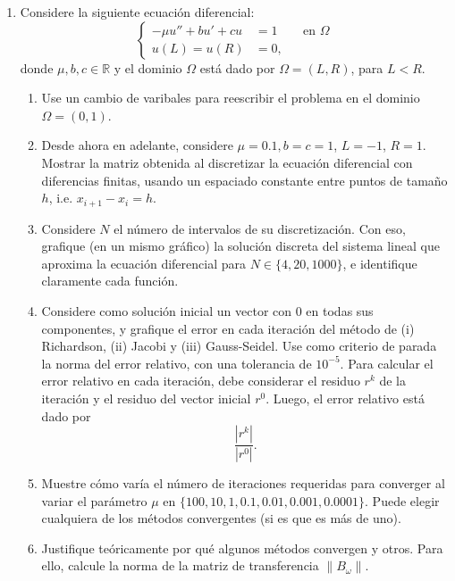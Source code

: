 \documentclass{article}
\newcommand{\pts}[1]{[{\bf #1 puntos}] }
\begin{document}
\begin{enumerate}
    \item Considere la siguiente ecuación diferencial: 
        $$
            \left\lbrace\begin{aligned}
                - \mu u'' + b u' + c u &= 1 && \text{en $\Omega$}\\
                u(L) = u(R) &= 0,
            \end{aligned}\right.
        $$
        donde $\mu, b,c\in \mathbb R$ y el dominio $\Omega$ está dado por $\Omega = (L, R)$, para $ L < R$. 
        \begin{enumerate}
            \item\pts{1} Use un cambio de varibales para reescribir el problema en el dominio $\Omega = (0,1)$.
            \item\pts{1} Desde ahora en adelante, considere $\mu=0.1, b=c=1$, $L=-1$, $R=1$. Mostrar la matriz obtenida al discretizar la ecuación diferencial con diferencias finitas, usando un espaciado constante entre puntos de tamaño $h$, i.e. $x_{i+1} - x_i = h$.
            \item\pts{1} Considere $N$ el número de intervalos de su discretización. Con eso, grafique (en un mismo gráfico) la solución discreta del sistema lineal que aproxima la ecuación diferencial para $N\in\{4, 20, 1000\}$, e identifique claramente cada función. 
            \item\pts{1}  Considere como solución inicial un vector con 0 en todas sus componentes, y grafique el error en cada iteración del método de (i) Richardson, (ii) Jacobi y (iii) Gauss-Seidel. Use como criterio de parada la norma del error relativo, con una tolerancia de $10^{-5}$. Para calcular el error relativo en cada iteración, debe considerar el residuo $r^k$ de la iteración y el residuo del vector inicial $r^0$. Luego, el error relativo está dado por 
                    $$ \frac{|r^k|}{|r^0|}. $$
            \item\pts{1} Muestre cómo varía el número de iteraciones requeridas para converger al variar el parámetro $\mu$ en $\{100,10,1,0.1,0.01,0.001,0.0001\}$. Puede elegir cualquiera de los métodos convergentes (si es que es más de uno).
            \item\pts{1} Justifique teóricamente por qué algunos métodos convergen y otros. Para ello, calcule la norma de la matriz de transferencia $\|B_\omega\|$.
    \end{enumerate}
\end{enumerate}
\end{document}

